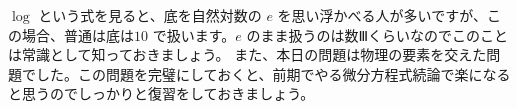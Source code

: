 \documentclass[dvipdfmx,uplatex]{jsarticle}
\begin{document}
\begin{spacing}{1.6}
\begin{qparts}
  \begin{shadebox}
    $ \log $ という式を見ると、底を自然対数の $ e $ を思い浮かべる人が多いですが、この場合、普通は底は$ 10 $ で扱います。$ e $ のまま扱うのは数Ⅲくらいなのでこのことは常識として知っておきましょう。
    \newline
    また、本日の問題は物理の要素を交えた問題でした。この問題を完璧にしておくと、前期でやる微分方程式続論で楽になると思うのでしっかりと復習をしておきましょう。
  \end{shadebox}
  \end{qparts}
\end{spacing}
\end{document}
